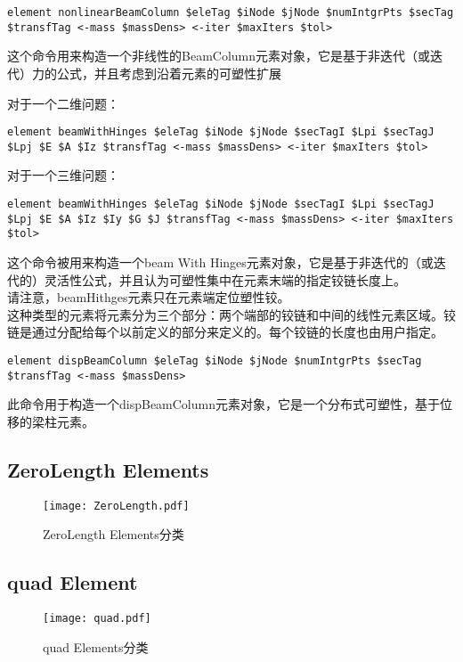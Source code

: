 \documentclass[lang=cn]{elegantpaper}
\begin{document}
\begin{lstlisting}
element nonlinearBeamColumn $eleTag $iNode $jNode $numIntgrPts $secTag $transfTag <-mass $massDens> <-iter $maxIters $tol>
\end{lstlisting}


这个命令用来构造一个非线性的BeamColumn元素对象，它是基于非迭代（或迭代）力的公式，并且考虑到沿着元素的可塑性扩展

对于一个二维问题：
\begin{lstlisting}
element beamWithHinges $eleTag $iNode $jNode $secTagI $Lpi $secTagJ $Lpj $E $A $Iz $transfTag <-mass $massDens> <-iter $maxIters $tol>
\end{lstlisting}


对于一个三维问题：
\begin{lstlisting}
element beamWithHinges $eleTag $iNode $jNode $secTagI $Lpi $secTagJ $Lpj $E $A $Iz $Iy $G $J $transfTag <-mass $massDens> <-iter $maxIters $tol>
\end{lstlisting}

这个命令被用来构造一个beam With Hinges元素对象，它是基于非迭代的（或迭代的）灵活性公式，并且认为可塑性集中在元素末端的指定铰链长度上。\\
请注意，beamHithges元素只在元素端定位塑性铰。\\
这种类型的元素将元素分为三个部分：两个端部的铰链和中间的线性元素区域。铰链是通过分配给每个以前定义的部分来定义的。每个铰链的长度也由用户指定。
\begin{lstlisting}
element dispBeamColumn $eleTag $iNode $jNode $numIntgrPts $secTag $transfTag <-mass $massDens>
\end{lstlisting}
此命令用于构造一个dispBeamColumn元素对象，它是一个分布式可塑性，基于位移的梁柱元素。
\subsection{ZeroLength Elements}
\begin{figure}[H]		
	\centering
	\texttt{[image: ZeroLength.pdf]}
	\caption{ZeroLength Elements分类}
	\label{tu11}
\end{figure}

\subsection{quad Element}
\begin{figure}[H]		
	\centering
	\texttt{[image: quad.pdf]}
	\caption{quad Elements分类}
	\label{tu12}
\end{figure}
\end{document}
